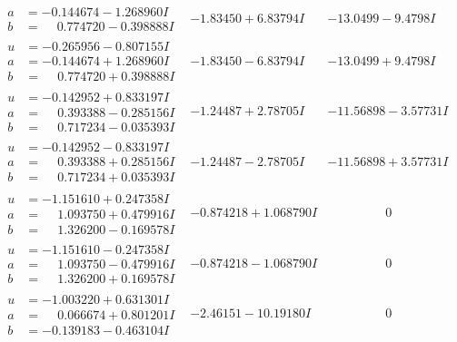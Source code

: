 \documentclass[1p]{elsarticle_modified}
\theoremstyle{definition}
\begin{document}
$$\begin{array}{c|c|c}
\begin{aligned}
a &= -0.144674 - 1.268960 I \\
b &= \phantom{-}0.774720 - 0.398888 I\end{aligned}
 & -1.83450 + 6.83794 I & -13.0499 - 9.4798 I \\ \hline\begin{aligned}
u &= -0.265956 - 0.807155 I \\
a &= -0.144674 + 1.268960 I \\
b &= \phantom{-}0.774720 + 0.398888 I\end{aligned}
 & -1.83450 - 6.83794 I & -13.0499 + 9.4798 I \\ \hline\begin{aligned}
u &= -0.142952 + 0.833197 I \\
a &= \phantom{-}0.393388 - 0.285156 I \\
b &= \phantom{-}0.717234 - 0.035393 I\end{aligned}
 & -1.24487 + 2.78705 I & -11.56898 - 3.57731 I \\ \hline\begin{aligned}
u &= -0.142952 - 0.833197 I \\
a &= \phantom{-}0.393388 + 0.285156 I \\
b &= \phantom{-}0.717234 + 0.035393 I\end{aligned}
 & -1.24487 - 2.78705 I & -11.56898 + 3.57731 I \\ \hline\begin{aligned}
u &= -1.151610 + 0.247358 I \\
a &= \phantom{-}1.093750 + 0.479916 I \\
b &= \phantom{-}1.326200 - 0.169578 I\end{aligned}
 & -0.874218 + 1.068790 I & \phantom{-0.000000 } 0 \\ \hline\begin{aligned}
u &= -1.151610 - 0.247358 I \\
a &= \phantom{-}1.093750 - 0.479916 I \\
b &= \phantom{-}1.326200 + 0.169578 I\end{aligned}
 & -0.874218 - 1.068790 I & \phantom{-0.000000 } 0 \\ \hline\begin{aligned}
u &= -1.003220 + 0.631301 I \\
a &= \phantom{-}0.066674 + 0.801201 I \\
b &= -0.139183 - 0.463104 I\end{aligned}
 & -2.46151 - 10.19180 I & \phantom{-0.000000 } 0 \\ \hline\begin{aligned}

\end{aligned}
\end{array}$$
\end{document}
